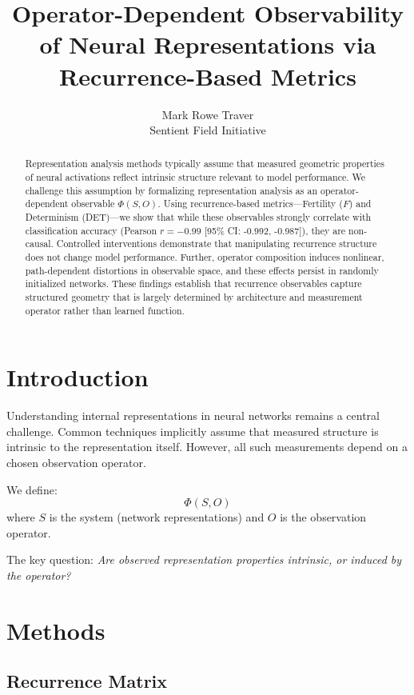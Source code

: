 \documentclass[11pt]{article}
\title{\textbf{Operator-Dependent Observability of Neural Representations via Recurrence-Based Metrics}}
\author{
Mark Rowe Traver \\
Sentient Field Initiative
}
\date{}
\begin{document}
\maketitle

\begin{abstract}
	Representation analysis methods typically assume that measured geometric properties of neural activations reflect intrinsic structure relevant to model performance. We challenge this assumption by formalizing representation analysis as an operator-dependent observable $\Phi(S, O)$. Using recurrence-based metrics—Fertility ($F$) and Determinism (DET)—we show that while these observables strongly correlate with classification accuracy (Pearson $r = -0.99$ [95\% CI: -0.992, -0.987]), they are non-causal. Controlled interventions demonstrate that manipulating recurrence structure does not change model performance. Further, operator composition induces nonlinear, path-dependent distortions in observable space, and these effects persist in randomly initialized networks. These findings establish that recurrence observables capture structured geometry that is largely determined by architecture and measurement operator rather than learned function.
\end{abstract}

\section{Introduction}

Understanding internal representations in neural networks remains a central challenge. Common techniques implicitly assume that measured structure is intrinsic to the representation itself. However, all such measurements depend on a chosen observation operator.

We define:
\[
	\Phi(S, O)
\]
where $S$ is the system (network representations) and $O$ is the observation operator.

The key question:
\textit{Are observed representation properties intrinsic, or induced by the operator?}

\section{Methods}

\subsection{Recurrence Matrix}
\end{document}

